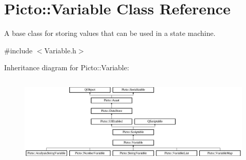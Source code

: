 \hypertarget{class_picto_1_1_variable}{\section{Picto\-:\-:Variable Class Reference}
\label{class_picto_1_1_variable}
}


A base class for storing values that can be used in a state machine.  




{\ttfamily \#include $<$Variable.\-h$>$}

Inheritance diagram for Picto\-:\-:Variable\-:\begin{figure}[H]
\begin{center}
\leavevmode
\includegraphics[height=4.284153cm]{class_picto_1_1_variable}
\end{center}
\end{figure}
